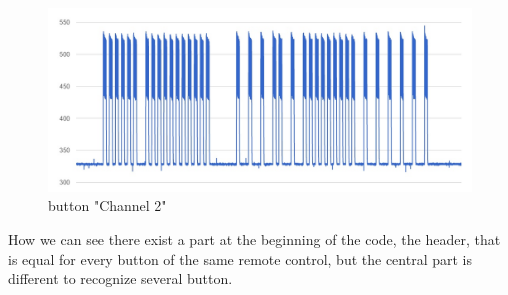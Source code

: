 \begin{figure}
	\centering
	\includegraphics[scale=0.5]{graphs/button2.jpg}%
	\caption{button "Channel 2"}
	
\end{figure}
 How we can see there exist a part at the beginning of the code, the header, that is equal for every button of the same remote control, but the central part is different to recognize several button.